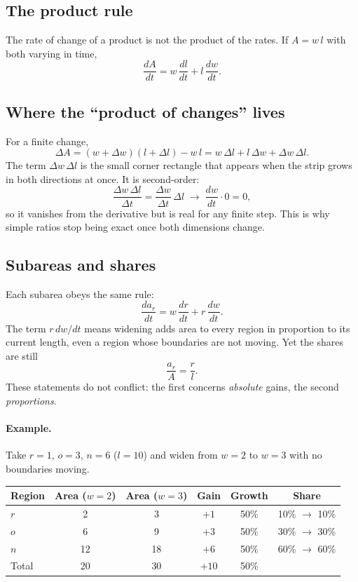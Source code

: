\documentclass[11pt]{article}
\begin{document}
\subsection{The product rule}

The rate of change of a product is not the product of the rates. If $A = w\,l$ with both varying in time,
\[
  \frac{dA}{dt} = w\,\frac{dl}{dt} + l\,\frac{dw}{dt}.
\]

\subsection{Where the ``product of changes'' lives}

For a finite change,
\[
  \Delta A = (w+\Delta w)(l+\Delta l) - w\,l
  = w\,\Delta l + l\,\Delta w + \Delta w\,\Delta l .
\]
The term $\Delta w\,\Delta l$ is the small corner rectangle that appears when the strip grows in both directions at once. It is second-order:
\[
  \frac{\Delta w\,\Delta l}{\Delta t} = \frac{\Delta w}{\Delta t}\,\Delta l \;\longrightarrow\; \frac{dw}{dt}\cdot 0 = 0,
\]
so it vanishes from the derivative but is real for any finite step. This is why simple ratios stop being exact once both dimensions change.

\subsection{Subareas and shares}

Each subarea obeys the same rule:
\[
  \frac{da_r}{dt} = w\,\frac{dr}{dt} + r\,\frac{dw}{dt}.
\]
The term $r\,dw/dt$ means widening adds area to every region in proportion to its current length, even a region whose boundaries are not moving. Yet the shares are still
\[
  \frac{a_r}{A} = \frac{r}{l}.
\]
These statements do not conflict: the first concerns \emph{absolute} gains, the second \emph{proportions}.

\paragraph{Example.} Take $r=1$, $o=3$, $n=6$ ($l=10$) and widen from $w=2$ to $w=3$ with no boundaries moving.

\begin{center}
\begin{tabular}{lccccc}
\toprule
Region & Area ($w=2$) & Area ($w=3$) & Gain & Growth & Share \\
\midrule
$r$ & 2  & 3  & $+1$  & 50\% & 10\% $\to$ 10\% \\
$o$ & 6  & 9  & $+3$  & 50\% & 30\% $\to$ 30\% \\
$n$ & 12 & 18 & $+6$  & 50\% & 60\% $\to$ 60\% \\
\midrule
Total & 20 & 30 & $+10$ & 50\% & \\
\bottomrule
\end{tabular}
\end{center}
\end{document}

